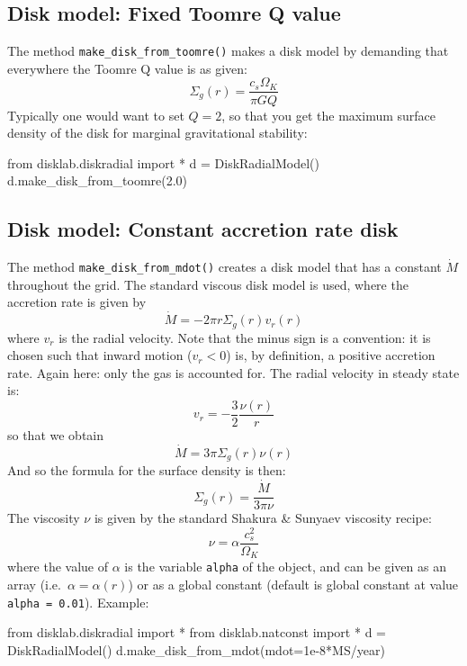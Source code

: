 \documentclass{book}
\newcommand{\code}[1]{{\small\tt #1}}
\begin{document}
\subsection{Disk model: Fixed Toomre Q value}
The method \code{make\_disk\_from\_toomre()} makes a disk model by demanding
that everywhere the Toomre Q value is as given:
\begin{equation}
\Sigma_g(r) = \frac{c_s\Omega_K}{\pi G Q}
\end{equation}
Typically one would want to set $Q=2$, so that you get the maximum surface density
of the disk for marginal gravitational stability:
\begin{codebox}
from disklab.diskradial import *
d = DiskRadialModel()
d.make_disk_from_toomre(2.0)
\end{codebox}

\subsection{Disk model: Constant accretion rate disk}
The method \code{make\_disk\_from\_mdot()} creates a disk model that has
a constant $\dot M$ throughout the grid. The standard viscous disk model is
used, where the accretion rate is given by
\begin{equation}
\dot M = -2\pi r \Sigma_g(r) v_r(r)
\end{equation}
where $v_r$ is the radial velocity. Note that the minus sign is a convention:
it is chosen such that inward motion ($v_r<0$) is, by definition, a positive
accretion rate. Again here: only the gas is accounted for.
The radial velocity in steady state is:
\begin{equation}
v_r = -\frac{3}{2}\frac{\nu(r)}{r}
\end{equation}
so that we obtain
\begin{equation}
\dot M = 3\pi \Sigma_g(r) \nu(r)
\end{equation}
And so the formula for the surface density is then:
\begin{equation}
\Sigma_g(r) = \frac{\dot M}{3\pi\nu}
\end{equation}
The viscosity $\nu$ is given by the standard Shakura \& Sunyaev viscosity recipe:
\begin{equation}\label{eq-ss-alpha-visc}
\nu = \alpha\frac{c_s^2}{\Omega_K}
\end{equation}
where the value of $\alpha$ is the variable \code{alpha} of the object, and
can be given as an array (i.e.~$\alpha=\alpha(r)$) or as a global constant (default
is global constant at value \code{alpha = 0.01}). Example:
\begin{codebox}
from disklab.diskradial import *
from disklab.natconst import *
d = DiskRadialModel()
d.make_disk_from_mdot(mdot=1e-8*MS/year)
\end{codebox}
\end{document}
